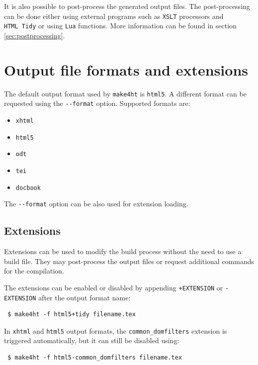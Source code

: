 It is also possible to post-process the generated output files. The
post-processing can be done either using external programs such as
\texttt{XSLT} processors and \texttt{HTML\ Tidy} or using \texttt{Lua}
functions. More information can be found in section
\ref{sec:postprocessing}.

\section{Output file formats and
extensions}\label{output-file-formats-and-extensions}

\label{sec:output}

The default output format used by \texttt{make4ht} is \texttt{html5}. A
different format can be requested using the \texttt{-\/-format} option.
Supported formats are:

\begin{itemize}
\tightlist
\item
  \texttt{xhtml}
\item
  \texttt{html5}
\item
  \texttt{odt}
\item
  \texttt{tei}
\item
  \texttt{docbook}
\end{itemize}

The \texttt{-\/-format} option can be also used for extension loading.

\subsection{Extensions}\label{extensions}

Extensions can be used to modify the build process without the need to
use a build file. They may post-process the output files or request
additional commands for the compilation.

The extensions can be enabled or disabled by appending
\texttt{+EXTENSION} or \texttt{-EXTENSION} after the output format name:

\begin{verbatim}
 $ make4ht -f html5+tidy filename.tex
\end{verbatim}

In \texttt{xhtml} and \texttt{html5} output formats, the
\texttt{common\_domfilters} extension is triggered automatically, but it
can still be disabled using:

\begin{verbatim}
 $ make4ht -f html5-common_domfilters filename.tex
\end{verbatim}

